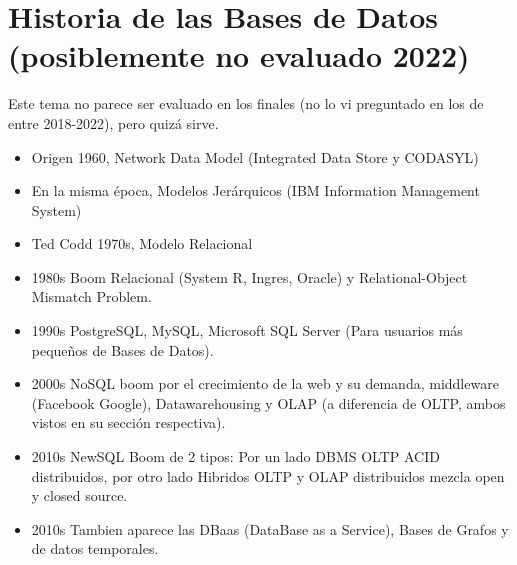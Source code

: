 ﻿\section*{Historia de las Bases de Datos (posiblemente no evaluado 2022)}

Este tema no parece ser evaluado en los finales (no lo vi preguntado
en los de entre 2018-2022), pero quizá sirve.

\begin{itemize}
    \item Origen 1960, Network Data Model (Integrated Data Store y CODASYL)
    \item En la  misma época, Modelos Jerárquicos (IBM Information Management System)
    \item Ted Codd 1970s, Modelo Relacional
    \item 1980s Boom Relacional (System R, Ingres, Oracle) y Relational-Object Mismatch Problem.
    \item 1990s PostgreSQL, MySQL, Microsoft SQL Server (Para usuarios
    más pequeños de Bases de Datos).
    \item 2000s NoSQL boom por el crecimiento de la web y su demanda, middleware (Facebook Google), Datawarehousing y OLAP (a diferencia de OLTP, ambos vistos en su sección respectiva).
    \item 2010s NewSQL Boom de 2 tipos: Por un lado DBMS OLTP ACID distribuidos, por otro lado
Hibridos OLTP y OLAP distribuidos mezcla open y closed source.
    \item 2010s Tambien aparece las DBaas (DataBase as a Service), Bases de Grafos y de datos temporales.
\end{itemize}